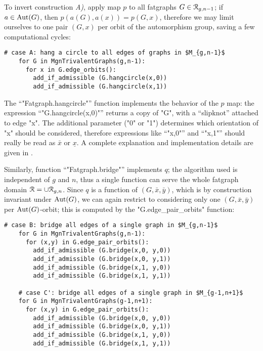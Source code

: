 To invert construction {\slshape A)}, apply map $p$ to all fatgraphs $G \in
\mathcal{R}_{g,n-1}$; if $a \in \operatorname{Aut}(G)$, then $p(a(G), a(x)) = p(G, x)$,
therefore we may limit ourselves to one pair $(G,x)$ per orbit of the
automorphism group, saving a few computational cycles:
\begin{lstlisting}[name=MgnTrivalentGraphs,firstnumber=30]
    # case A: hang a circle to all edges of graphs in $M_{g,n-1}$
    for G in MgnTrivalentGraphs(g,n-1):
      for x in G.edge_orbits():
        add_if_admissible (G.hangcircle(x,0))
        add_if_admissible (G.hangcircle(x,1))

\end{lstlisting}
The ``"Fatgraph.hangcircle"'' function implements the behavior of the
$p$ map: the expression ``"G.hangcircle(x,0)"'' returns a copy of
"G", with a ``slipknot'' attached to edge "x".  The additional
parameter ("0" or "1") determines which orientation of "x"
should be considered, therefore expressions like ``"x,0"'' and
``"x,1"'' should really be read as $\bar{x}$ or $\underline{x}$. A
complete explanation and implementation details are given in
.

Similarly, function ``"Fatgraph.bridge"'' implements $q$;
the algorithm used is independent of $g$ and $n$, thus a single
function can serve the whole fatgraph domain $\mathcal{R} = \cup
\mathcal{R}_{g,n}$. Since $q$ is a function of $(G, \bar{x}, \bar{y})$, which
is by construction invariant under $\operatorname{Aut}(G)$, we can again restrict
to considering only one $(G, \bar{x}, \bar{y})$ per $\operatorname{Aut}(G)$-orbit;
this is computed by the "G.edge_pair_orbits" function:
\begin{lstlisting}[name=MgnTrivalentGraphs,firstnumber=35]
    # case B: bridge all edges of a single graph in $M_{g,n-1}$
    for G in MgnTrivalentGraphs(g,n-1):
      for (x,y) in G.edge_pair_orbits():
        add_if_admissible (G.bridge(x,0, y,0))
        add_if_admissible (G.bridge(x,0, y,1))
        add_if_admissible (G.bridge(x,1, y,0))
        add_if_admissible (G.bridge(x,1, y,1))

    # case C': bridge all edges of a single graph in $M_{g-1,n+1}$
    for G in MgnTrivalentGraphs(g-1,n+1):
      for (x,y) in G.edge_pair_orbits():
        add_if_admissible (G.bridge(x,0, y,0))
        add_if_admissible (G.bridge(x,0, y,1))
        add_if_admissible (G.bridge(x,1, y,0))
        add_if_admissible (G.bridge(x,1, y,1))

\end{lstlisting}

